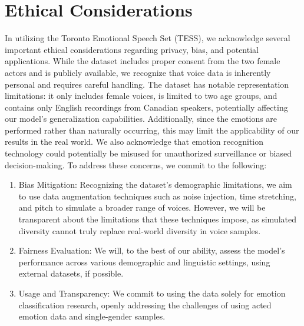 \documentclass[../main.tex]{subfiles}
\begin{document}
\section{Ethical Considerations}
In utilizing the Toronto Emotional Speech Set (TESS), we acknowledge several 
important ethical considerations regarding privacy, bias, and potential 
applications. While the dataset includes proper consent from the two female 
actors and is publicly available, we recognize that voice data is inherently 
personal and requires careful handling. The dataset has notable representation 
limitations: it only includes female voices, is limited to two age groups, and 
contains only English recordings from Canadian speakers, potentially affecting 
our model's generalization capabilities. Additionally, since the emotions are 
performed rather than naturally occurring, this may limit the applicability of 
our results in the real world. We also acknowledge that emotion recognition 
technology could potentially be misused for unauthorized surveillance or biased 
decision-making. To address these concerns, we commit to the following: 

\begin{enumerate}
    \item Bias Mitigation: Recognizing the dataset's demographic limitations, we aim to 
    use data augmentation techniques such as noise injection, time stretching, 
    and pitch  to simulate a broader range of voices. However, 
    we will be transparent about the limitations that these techniques impose, as 
    simulated diversity cannot truly replace real-world diversity in voice samples.

    \item Fairness Evaluation: We will, to the best of our ability, assess the model's 
    performance across various demographic and linguistic settings, using external 
    datasets, if possible.

    \item Usage and Transparency: We commit to using the data solely for emotion 
    classification research, openly addressing the challenges of using acted 
    emotion data and single-gender samples.    
\end{enumerate}
\end{document}
